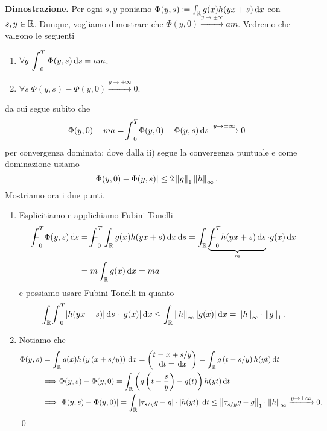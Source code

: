 \textbf{Dimostrazione.}
Per ogni $s, y$ poniamo $\Phi(y, s) \coloneqq \int_\mathbb R g(x) h(yx + s) \,\mathrm{d} x$ con $s, y \in \mathbb R$. Dunque, vogliamo dimostrare che $\Phi(y, 0) \xrightarrow{y \to \pm\infty} a m$.
Vedremo che valgono le seguenti
\begin{enumerate}
	\item $\forall y \; \ds \avint_0^T \Phi(y, s) \dd s = am$.
	\item $\forall s \; \Phi(y, s) - \Phi(y, 0) \xrightarrow{y \to \pm \infty} 0$.
\end{enumerate}
da cui segue subito che
$$
\Phi(y, 0) - ma = \avint_0^T \Phi(y, 0) - \Phi(y, s) \dd s \xrightarrow{y \to \pm \infty} 0
$$
per convergenza dominata; dove dalla ii) segue la convergenza puntuale e come dominazione usiamo
$$
	\Phi(y, 0) - \Phi(y, s)| \leq 2 \left\lVert g \right\rVert_1 \left\lVert h \right\rVert_\infty.
$$
Mostriamo ora i due punti.
\begin{enumerate}
	\item Esplicitiamo e applichiamo Fubini-Tonelli
		$$
		\begin{aligned}
			\avint_0^T \Phi(y, s) \dd s
			&= \avint_0^T \int_\R g(x) h(yx + s) \dd x \dd s
			= \int_\R \underbrace{\avint_0^T h(yx + s) \dd s}_m \cdot g(x) \dd x \\
			&= m \int_\R g(x) \dd x = m a
		\end{aligned}
		$$
		e possiamo usare Fubini-Tonelli in quanto 
		$$
			\ds \int_\R \avint_0^T |h(yx - s)| \dd s \cdot |g(x)| \dd x \leq \int_\R \norm{h}_\infty |g(x)| \dd x = \norm{h}_\infty \cdot \norm{g}_1.
		$$

	\item Notiamo che
		\begin{align*}
			\Phi(y, s) 
			& = \int_\mathbb R g(x) h\left(y \left( x + s/y \right)\right) \,\mathrm{d} x
			= \begin{pmatrix}
				t = x + s/y \\
				\,\mathrm{d} t = \,\mathrm{d} x
			\end{pmatrix} 
			= \int_\mathbb R g \left( t - s/y \right) h(yt) \,\mathrm{d} t \\
			& \Longrightarrow \Phi(y, s) - \Phi(y, 0) = \int_\mathbb R \left(g\left( t - \frac{s}{y}\right) - g(t) \right) h(yt) \,\mathrm{d} t \\
			& \Longrightarrow 
			|\Phi(y, s) - \Phi(y, 0)| = \int_\mathbb R |\tau_{s/y} g - g| \cdot |h(yt)| \,\mathrm{d} t
			\leq \left\lVert \tau_{s/y} g - g \right\rVert_1 \cdot \left\lVert h \right\rVert_\infty \xrightarrow{y \to \pm \infty} 0.
		\end{align*}
\qed
\end{enumerate}

